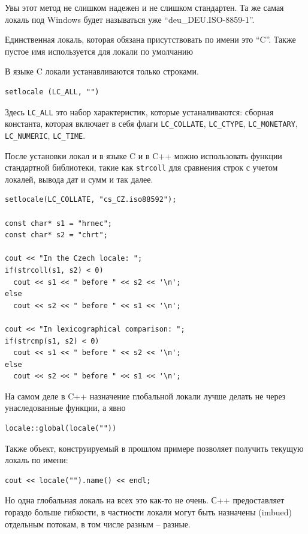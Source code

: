 \documentclass[a4paper,12pt,oneside]{article}
\begin{document}
Увы этот метод не слишком надежен и не слишком стандартен. Та же самая локаль под Windows будет называться уже ``deu\_DEU.ISO-8859-1''.

Единственная локаль, которая обязана присутствовать по имени это ``C''. Также пустое имя используется для локали по умолчанию

В языке C локали устанавливаются только строками.

\begin{lstlisting}
setlocale (LC_ALL, "")
\end{lstlisting}

Здесь \lstinline!LC_ALL! это набор характеристик, которые устаналиваются: сборная константа, которая включает в себя флаги \lstinline!LC_COLLATE!, \lstinline!LC_CTYPE!, \lstinline!LC_MONETARY!, \lstinline!LC_NUMERIC!, \lstinline!LC_TIME!.

После установки локал
и в языке C и в C++ можно использовать функции стандартной библиотеки, такие как \lstinline!strcoll! для сравнения строк с учетом локалей, вывода дат и сумм и так далее.

\begin{lstlisting}
setlocale(LC_COLLATE, "cs_CZ.iso88592");
 
const char* s1 = "hrnec";
const char* s2 = "chrt";
 
cout << "In the Czech locale: ";
if(strcoll(s1, s2) < 0)
  cout << s1 << " before " << s2 << '\n';
else
  cout << s2 << " before " << s1 << '\n';

cout << "In lexicographical comparison: ";
if(strcmp(s1, s2) < 0)
  cout << s1 << " before " << s2 << '\n';
else
  cout << s2 << " before " << s1 << '\n';
\end{lstlisting}

На самом деле в C++ назначение глобальной локали лучше делать не через унаследованные функции, а явно

\begin{lstlisting}
locale::global(locale(""))
\end{lstlisting}

Также объект, конструируемый в прошлом примере позволяет получить текущую локаль по имени:

\begin{lstlisting}
cout << locale("").name() << endl;
\end{lstlisting}

Но одна глобальная локаль на всех это как-то не очень. С++ предоставляет гораздо больше гибкости, в частности локали могут быть назначены (imbued) отдельным потокам, в том числе разным -- разные.
\end{document}
